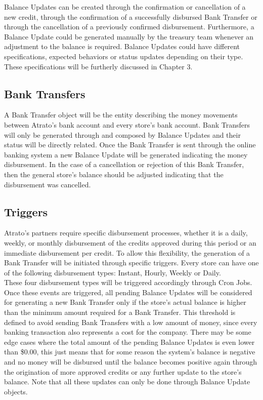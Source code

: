 Balance Updates can be created through the confirmation or cancellation of a new credit, through the confirmation of a successfully disbursed Bank Transfer or through the cancellation of a previously confirmed disbursement. Furthermore, a Balance Update could be generated manually by the treasury team whenever an adjustment to the balance is required. Balance Updates could have different specifications, expected behaviors or status updates depending on their type. These specifications will be furtherly discussed in Chapter 3.

\subsection{Bank Transfers} 
A Bank Transfer object will be the entity describing the money movements between Atrato’s bank account and every store’s bank account. Bank Transfers will only be generated through and composed by Balance Updates and their status will be directly related. Once the Bank Transfer is sent through the online banking system a new Balance Update will be generated indicating the money disbursement. In the case of a cancellation or rejection of this Bank Transfer, then the general store's balance should be adjusted indicating that the disbursement was cancelled.

\subsection{Triggers}
Atrato’s partners require specific disbursement processes, whether it is a daily, weekly, or monthly disbursement of the credits approved during this period or an immediate disbursement per credit. To allow this flexibility, the generation of a Bank Transfer will be initiated through specific triggers. Every store can have one of the following disbursement types: Instant, Hourly, Weekly or Daily.\\

These four disbursement types will be triggered accordingly through Cron Jobs. Once these events are triggered, all pending Balance Updates will be considered for generating a new Bank Transfer only if the store's actual balance is higher than the minimum amount required for a Bank Transfer. This threshold is defined to avoid sending Bank Transfers with a low amount of money, since every banking transaction also represents a cost for the company. There may be some edge cases where the total amount of the pending Balance Updates is even lower than \$0.00, this just means that for some reason the system’s balance is negative and no money will be disbursed until the balance becomes positive again through the origination of more approved credits or any further update to the store’s balance. Note that all these updates can only be done through Balance Update objects.

